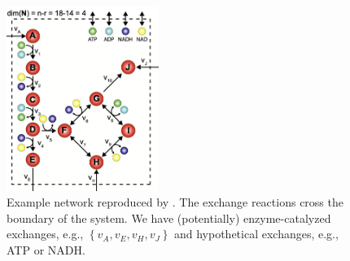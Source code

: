 \documentclass{article}[11pt]
\begin{document}
\begin{figure}
   \centering
 \includegraphics[width=0.44\textwidth]{./figs/Fig-ExchangeReactions.png}
 \caption{Example network reproduced by \citep{Bordbar:2014aa}.
 The exchange reactions cross the boundary of the system. We have (potentially) enzyme-catalyzed 
 exchanges, e.g., $\left\{v_{A},v_{E}, v_{H}, v_{J}\right\}$ and hypothetical exchanges, e.g., ATP or NADH.}\label{fig:example-exchange-reactions}
\end{figure}
\end{document}
